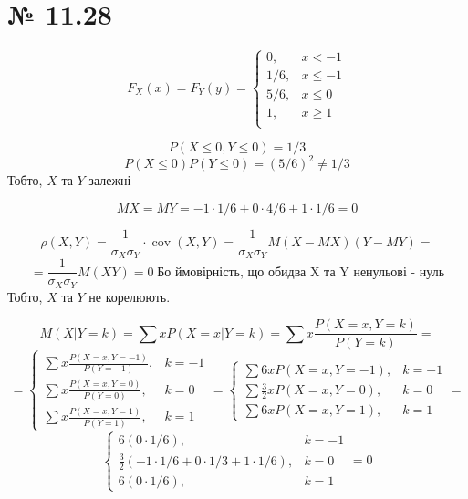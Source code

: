 \documentclass[11pt, a4paper]{article} %
\begin{document}



\section*{№ 11.28}
$$F_X(x) = F_Y(y) = \begin{cases}
    0,& x<-1\\
    1/6,& x\le -1\\ 
    5/6,& x\le 0\\ 
    1,& x\ge 1\\ 
\end{cases}$$

$$P(X\le 0, Y\le 0) = 1/3$$
$$P(X\le 0)P(Y\le 0) = (5/6)^2 \ne 1/3$$
Тобто, $X$ та $Y$ залежні

$$MX = MY = -1\cdot 1/6 + 0\cdot 4/6 + 1 \cdot 1/6 = 0$$

$$\rho(X,Y) = \frac{1}{\sigma_X \sigma_Y} \cdot \operatorname{cov}(X,Y) = \frac{1}{\sigma_X \sigma_Y} M(X-MX)(Y-MY) = $$
$$=\frac{1}{\sigma_X \sigma_Y} M(XY) = 0 \;\text{Бо ймовірність, що обидва X та Y ненульові - нуль}$$
Тобто, $X$ та $Y$ не корелюють. 

$$M(X|Y=k) = \sum xP(X=x|Y=k) = \sum x\frac{P(X=x,Y=k)}{P(Y=k)} = $$
$$= \begin{cases}
    \sum x\frac{P(X=x,Y=-1)}{P(Y=-1)}, & k = -1\\
    \sum x\frac{P(X=x,Y=0)}{P(Y=0)}, & k = 0\\
    \sum x\frac{P(X=x,Y=1)}{P(Y=1)}, & k = 1
\end{cases} = \begin{cases}
    \sum 6xP(X=x,Y=-1), & k = -1\\
    \sum \frac{3}{2}xP(X=x,Y=0), & k = 0\\
    \sum 6xP(X=x,Y=1), & k = 1
\end{cases} = $$
$$\begin{cases}
    6(0\cdot 1/6), & k = -1\\
    \frac{3}{2}(-1 \cdot 1/6 + 0 \cdot 1/3 + 1 \cdot 1/6), & k = 0\\
    6(0\cdot 1/6), & k = 1
\end{cases} = 0$$
\end{document}
